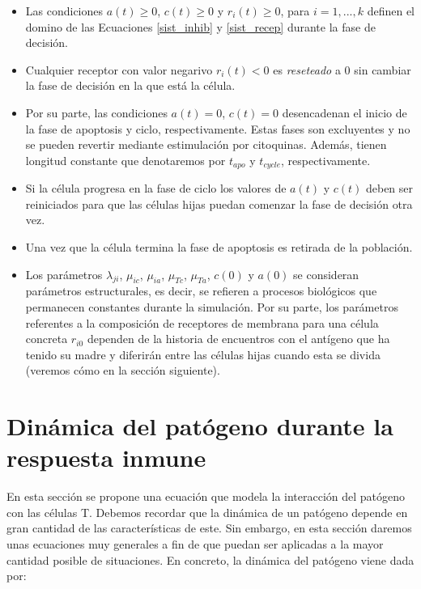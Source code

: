 \begin{itemize}
	\item Las condiciones $a(t)\geq0$, $c(t)\geq0$ y $r_i(t)\geq0$, para $i=1,...,k$ definen el domino de las Ecuaciones \ref{sist_inhib} y \ref{sist_recep} durante la fase de decisión. 
	
	\item Cualquier receptor con valor negarivo $r_i(t) < 0$ es \textit{reseteado} a $0$ sin cambiar la fase de decisión en la que está la célula.
	
	\item Por su parte, las condiciones $a(t)=0$, $c(t)=0$ desencadenan el inicio de la fase de apoptosis y ciclo, respectivamente. Estas fases son excluyentes y no se pueden revertir mediante estimulación por citoquinas. Además, tienen longitud constante que denotaremos por $t_{apo}$ y $t_{cycle}$, respectivamente.
	
	\item Si la célula progresa en la fase de ciclo los valores de $a(t)$ y $c(t)$ deben ser reiniciados para que las células hijas puedan comenzar la fase de decisión otra vez. 
	
	\item Una vez que la célula termina la fase de apoptosis es retirada de la población.
	
	\item Los parámetros $\lambda_{ji}$, $\mu_{ic}$, $\mu_{ia}$, $\mu_{Tc}$, $\mu_{Ta}$, $c(0)$ y $a(0)$ se consideran parámetros estructurales, es decir, se refieren a procesos biológicos que permanecen constantes durante la simulación. Por su parte, los parámetros referentes a la composición de receptores de membrana para una célula concreta $r_{i0}$ dependen de la historia de encuentros con el antígeno que ha tenido su madre y diferirán entre las células hijas cuando esta se divida (veremos cómo en la sección siguiente).
\end{itemize}


\section{Dinámica del patógeno durante la respuesta inmune}
\label{sec:modeloPatCelT}

En esta sección se propone una ecuación que modela la interacción del patógeno con las células T. Debemos recordar que la dinámica de un patógeno depende en gran cantidad de las características de este. Sin embargo, en esta sección daremos unas ecuaciones muy generales a fin de que puedan ser aplicadas a la mayor cantidad posible de situaciones. En concreto, la dinámica del patógeno viene dada por:

